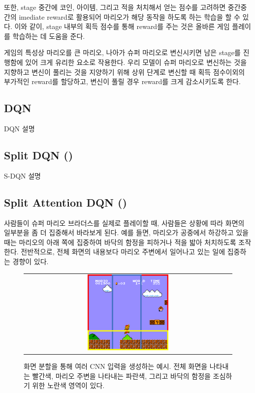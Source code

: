 또한, stage 중간에 코인, 아이템, 그리고 적을 처치해서 얻는 점수를 고려하면 중간중간의 imediate reward로 활용되어 마리오가 해당 동작을 하도록 하는 학습을 할 수 있다.
이와 같이, stage 내부의 획득 점수를 통해 reward를 주는 것은 올바른 게임 플레이를 학습하는 데 도움을 준다.

게임의 특성상 마리오를 큰 마리오, 나아가 슈퍼 마리오로 변신시키면 남은 stage를 진행함에 있어 크게 유리한 요소로 작용한다.
우리 모델이 슈퍼 마리오로 변신하는 것을 지향하고 변신이 풀리는 것을 지양하기 위해 상위 단계로 변신할 때 획득 점수이외의 부가적인 reward를 할당하고, 변신이 풀릴 경우 reward를 크게 감소시키도록 한다.

\subsection{DQN}
\label{sec:method:dqn}
DQN 설명

\subsection{Split DQN (\sdqnname)}
\label{sec:method:sdqn}
S-DQN 설명

\subsection{Split Attention DQN (\sadqnname)}
\label{sec:method:idea}
사람들이 슈퍼 마리오 브라더스를 실제로 플레이할 때, 사람들은 상황에 따라 화면의 일부분을 좀 더 집중해서 바라보게 된다.
예를 들면, 마리오가 공중에서 하강하고 있을 때는 마리오의 아래 쪽에 집중하여 바닥의 함정을 피하거나 적을 밟아 처치하도록 조작한다.
전반적으로, 전체 화면의 내용보다 마리오 주변에서 일어나고 있는 일에 집중하는 경향이 있다.

\begin{figure}[]
\begin{center}
\begin{tabular}{c}
     \includegraphics[width=0.4\textwidth]{FIG/split_screen.pdf} \\
\end{tabular}
\caption{
	화면 분할을 통해 여러 CNN 입력을 생성하는 예시. 전체 화면을 나타내는 빨간색, 마리오 주변을 나타내는 파란색, 그리고 바닥의 함정을 조심하기 위한 노란색 영역이 있다.
}
\label{fig:split_screen}
\end{center}
\end{figure}

